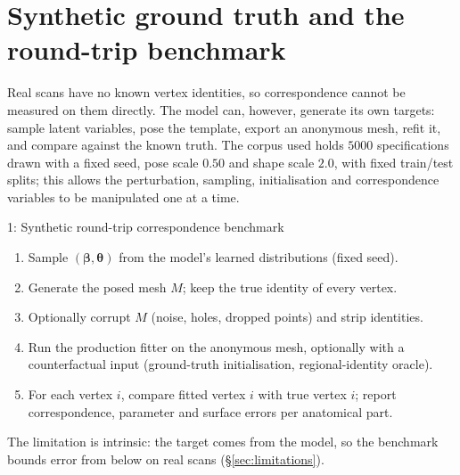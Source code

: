 \section{Synthetic ground truth and the round-trip benchmark}
\label{sec:synthetic-method}

Real scans have no known vertex identities, so correspondence cannot be
measured on them directly. The model can, however, generate its own targets:
sample latent variables, pose the template, export an anonymous mesh, refit
it, and compare against the known truth. The corpus used holds $5000$
specifications drawn with a fixed seed, pose scale $0.50$ and shape scale
$2.0$, with fixed train/test splits; this allows the perturbation, sampling,
initialisation and correspondence variables to be manipulated one at a time.

\begin{algbox}{1: Synthetic round-trip correspondence benchmark}
\begin{enumerate}[nosep,leftmargin=1.4em]
\item Sample $(\bm\beta,\bm\theta)$ from the model's learned distributions (fixed seed).
\item Generate the posed mesh $M$; keep the true identity of every vertex.
\item Optionally corrupt $M$ (noise, holes, dropped points) and strip identities.
\item Run the production fitter on the anonymous mesh, optionally with a
counterfactual input (ground-truth initialisation, regional-identity oracle).
\item For each vertex $i$, compare fitted vertex $i$ with true vertex $i$;
report correspondence, parameter and surface errors per anatomical part.
\end{enumerate}
\end{algbox}

The limitation is intrinsic: the target comes from the model, so the
benchmark bounds error from below on real scans (\S\ref{sec:limitations}).

